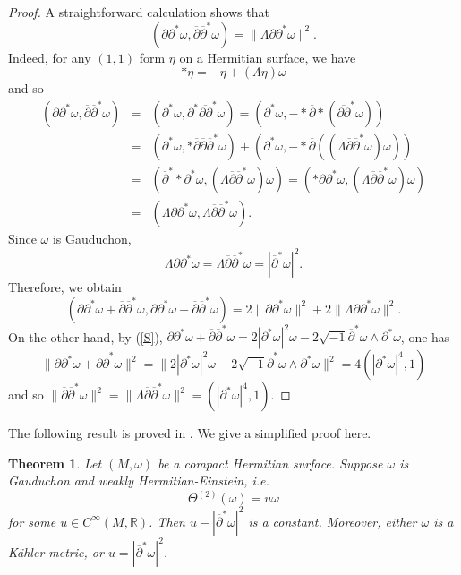 \documentclass[12pt]{amsart}
\newcommand\bp{{\bar\partial}}
\theoremstyle{plain}
\newtheorem{thm}{Theorem}[section]
\theoremstyle{definition}
\newcommand{\btheorem}{\begin{thm}}
\newcommand{\etheorem}{\end{thm}}
\newcommand{\bproof}{\begin{proof}}
\newcommand{\eproof}{\end{proof}}
\newcommand{\sq}{\sqrt{-1}}
\newcommand{\p}{\partial}
\renewcommand{\bar}{\overline}
\newcommand{\beq}{\begin{equation}}
\newcommand{\eeq}{\end{equation}}
\newcommand{\ee}{\end{eqnarray*}}
\newcommand{\be}{\begin{eqnarray*}}
\renewcommand{\bp}{\bar{\partial}}
\renewcommand{\>}{\rightarrow}
\newcommand{\R}{{\mathbb R}}
\numberwithin{equation}{section} %
\begin{document}
\bproof  A straightforward calculation shows that 
\beq \left(\p\p^*\omega, \bp\bp^*\omega \right)=\|\Lambda\p\p^*\omega\|^2.\eeq 
Indeed, for any $(1,1)$ form $\eta$ on a Hermitian surface,  we have 
\beq *\eta=-\eta+(\Lambda \eta)\omega \eeq
and  so
\be 
\left(\p\p^*\omega, \bp\bp^*\omega \right)&=&\left(\partial^{*} \omega, \partial^{*} \overline{\partial \partial}^{*} \omega\right)=\left(\partial^{*} \omega,-* \bar{\partial} *\left(\overline{\partial \partial}^{*} \omega\right)\right) \\
&=&\left(\partial^{*} \omega, *\bp \bp \bp^{*} \omega\right)+\left(\partial^{*} \omega,-* \bar{\partial}\left(\left(\Lambda \bp \bp^{*} \omega\right) \omega\right)\right) \\
&=&\left(\bar{\partial}^{*} *\partial^{*} \omega,\left(\Lambda \bp \bp^{*} \omega\right) \omega\right)=\left(* \partial \partial^{*} \omega,\left(\Lambda \bp \bp^{*}\omega\right) \omega\right) \\
&=&\left(\Lambda \p \p^{*}\omega, \Lambda  \bp \bp^{*}\omega\right) .
\ee 
Since $\omega$ is Gauduchon, 
\beq \Lambda \p \p^{*}\omega=\Lambda  \bp \bp^{*}\omega=|\bp^*\omega|^2. \eeq 
Therefore, we obtain
\beq \left(\p\p^*\omega+\bp\bp^*\omega,\p\p^*\omega+\bp\bp^*\omega \right)=2\|\p\p^*\omega\|^2+2\|\Lambda\p\p^*\omega\|^2. \eeq 
On the other hand, by (\ref{S}), $\p\p^*\omega+\bp\bp^*\omega=2|\p^*\omega|^2\omega-2\sq \bp^*\omega\wedge \p^*\omega$, one has
$$\|\p\p^*\omega+\bp\bp^*\omega\|^2=\|2|\p^*\omega|^2\omega-2\sq \bp^*\omega\wedge \p^*\omega\|^2=4(|\p^*\omega|^4,1)$$
and so $\|\bp\bp^*\omega\|^2=\|\Lambda\bp\bp^*\omega\|^2=(|\p^*\omega|^4,1)$.
\eproof 

\noindent The following result is proved in \cite[Theorem~2]{Gauduchon1997}.  We give a simplified proof here.
	
	\btheorem\label{GI} Let $(M,\omega)$ be a compact Hermitian surface. Suppose $\omega$ is  Gauduchon and weakly Hermitian-Einstein, i.e. 
	\beq \Theta^{(2)}(\omega)=u \omega \eeq 
	for some $u\in C^\infty(M,\R)$. Then $u-|\bp^*\omega|^2$ is a constant. Moreover, either  $\omega$ is a K\"ahler metric, or  $u=|\bp^*\omega|^2$.
	\etheorem
	
\end{document}
